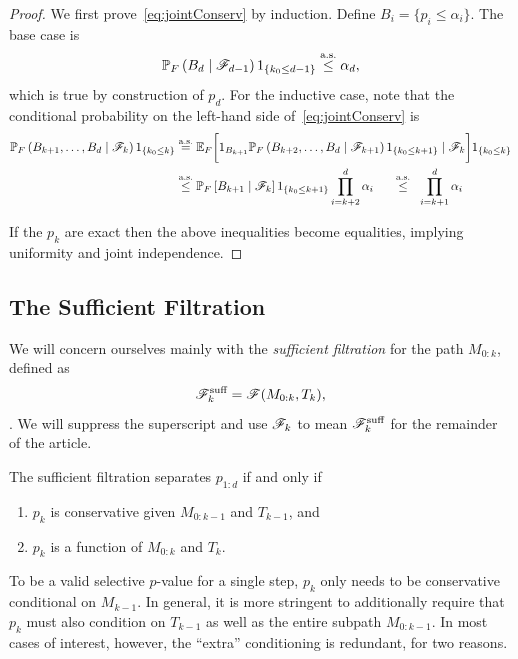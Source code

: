 \documentclass{article}
\begin{document}
\begin{proof}
  We first prove~\eqref{eq:jointConserv}
  by induction. Define $B_i = \{p_i \leq \alpha_i\}$. 
  The base case is
  \[
  \mathbb{P}_F\left(B_d \mid \mathscr{F}_{d-1}\right)1_{\{k_0 \leq d-1\}} \overset{\textrm{a.s.}}{\leq} \alpha_d,
  \]
  which is true by construction of $p_d$. 
  For the inductive case, note that the
  conditional probability on the left-hand side
  of~\eqref{eq:jointConserv} is
  \begin{align*}
    \mathbb{P}_F\left(B_{k+1}, \ldots, B_d
      \mid \mathscr{F}_k\right)1_{\{k_0 \leq k\}} 
    &\overset{\textrm{a.s.}}{=} \mathbb{E}_F\bigg[ 1_{B_{k+1}} 
    \mathbb{P}_F\left(B_{k+2}, \ldots, B_d
      \mid \mathscr{F}_{k+1}\right)1_{\{k_0 \leq k+1\}}
    \mid \mathscr{F}_k\bigg]1_{\{k_0 \leq k\}}\\
    &\overset{\textrm{a.s.}}{\leq} \mathbb{P}_F\left[ B_{k+1}
      \mid \mathscr{F}_k\right]1_{\{k_0 \leq k+1\}}\prod_{i=k+2}^d \alpha_i
    \quad\;\;\overset{\textrm{a.s.}}{\leq}\;\; \prod_{i=k+1}^d \alpha_i
  \end{align*}

  If the $p_k$ are exact then the above 
  inequalities become equalities, implying uniformity and joint independence.
\end{proof}

\subsection{The Sufficient Filtration}\label{sec:suffFilt}

We will concern ourselves mainly with the {\em sufficient filtration} for the path $M_{0:k}$, defined as
\[
\mathscr{F}_k^{\text{suff}} = \mathscr{F}(M_{0:k}, T_k),
\]
 .
We will suppress the superscript and use $\mathscr{F}_k$ to mean $\mathscr{F}_k^{\text{suff}}$ for the remainder of the article. 

The sufficient filtration separates $p_{1:d}$ if and only if 
\begin{enumerate}
\item $p_k$ is conservative given $M_{0:k-1}$ and $T_{k-1}$, and
\item $p_k$ is a function of $M_{0:k}$ and $T_k$.
\end{enumerate}

To be a valid selective $p$-value for a single step, $p_k$ only needs to be conservative conditional on $M_{k-1}$. In general, it is more stringent to additionally require that $p_k$ must also condition on $T_{k-1}$ as well as the entire subpath $M_{0:k-1}$. In most cases of interest, however, the ``extra'' conditioning is redundant, for two reasons. 
\end{document}
